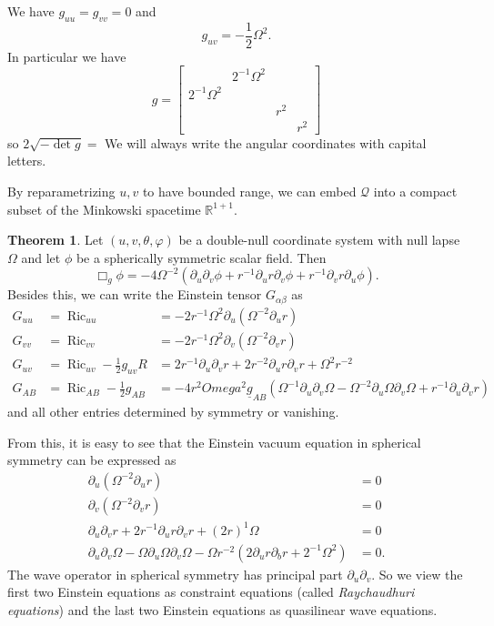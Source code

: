 \documentclass[12pt]{report}
\newcommand{\RR}{\mathbb{R}}
\newcommand{\Ric}{\operatorname{Ric}}
\newcommand{\Q}{\mathcal Q}
\newcommand{\dfn}[1]{\emph{#1}\index{#1}}
\theoremstyle{definition}
\newtheorem{theorem}{Theorem}[chapter]
\begin{document}
    We have $g_{uu} = g_{vv} = 0$ and
    $$g_{uv} = - \frac{1}{2} \Omega^2.$$
In particular we have
$$g = \begin{bmatrix}
&2^{-1}\Omega^2\\
2^{-1}\Omega^2\\
&&r^2\\
&&&r^2\end{bmatrix}$$
so
$2\sqrt{-\det g} = $
    We will always write the angular coordinates with capital letters.

    By reparametrizing $u,v$ to have bounded range, we can embed $\Q$ into a compact subset of the Minkowski spacetime $\RR^{1+1}$.
\begin{theorem}
    Let $(u, v, \theta, \varphi)$ be a double-null coordinate system with null lapse $\Omega$ and let $\phi$ be a spherically symmetric scalar field. Then
    $$\Box_g \phi = -4 \Omega^{-2}(\partial_u \partial_v \phi + r^{-1}\partial_u r \partial_v \phi + r^{-1} \partial_v r \partial_u \phi).$$
    Besides this, we can write the Einstein tensor $G_{\alpha\beta}$ as
\begin{align*}
    G_{uu} &= \Ric_{uu} &= -2r^{-1} \Omega^2 \partial_u (\Omega^{-2} \partial_u r)\\
    G_{vv} &= \Ric_{vv} &= -2r^{-1} \Omega^2 \partial_v (\Omega^{-2} \partial_v r)\\
    G_{uv} &= \Ric_{uv} - \frac{1}{2} g_{uv}R &= 2r^{-1} \partial_u \partial_v r + 2r^{-2} \partial_u r \partial_v r + \Omega^2r^{-2}\\
    G_{AB} &= \Ric_{AB} - \frac{1}{2}g_{AB} &= -4r^2 Omega^2\underline g_{AB}(\Omega^{-1} \partial_u \partial_v \Omega - \Omega^{-2} \partial_u \Omega \partial_v \Omega + r^{-1} \partial_u \partial_v r)
\end{align*}
    and all other entries determined by symmetry or vanishing.
\end{theorem}
From this, it is easy to see that the Einstein vacuum equation in spherical symmetry can be expressed as
\begin{align*}
    \partial_u(\Omega^{-2}\partial_u r) &= 0\\
    \partial_v(\Omega^{-2}\partial_v r) &= 0\\
    \partial_u \partial_v r + 2r^{-1} \partial_u r \partial_v r + (2r)^{1} \Omega &= 0\\
    \partial_u \partial_v \Omega - \Omega \partial_u \Omega \partial_v \Omega - \Omega r^{-2}(2\partial_u r \partial_b r + 2^{-1}\Omega^2) &= 0.
\end{align*}
The wave operator in spherical symmetry has principal part $\partial_u \partial_v$. So we view the first two Einstein equations as constraint equations (called \dfn{Raychaudhuri equations}) and the last two Einstein equations as quasilinear wave equations.
\end{document}
